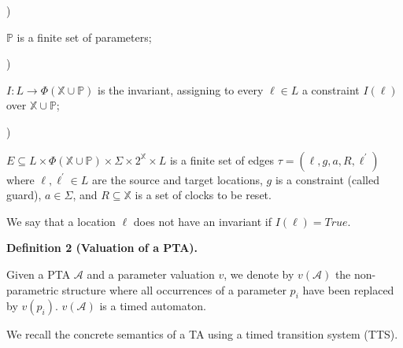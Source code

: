  
 
\par{}) 
 
$\mathbb{P}$ is a finite set of parameters;\par
 
 
 
\par{}) 
 
$I:L\to\Phi(\mathbb{X}\cup\mathbb{P})$ is the invariant, assigning to every $\mathrm{\ell}\in L$ a constraint $I(\mathrm{\ell})$ over $\mathbb{X}\cup\mathbb{P}$;\par
 
 
 
\par{}) 
 
$E\subseteq L\times\Phi(\mathbb{X}\cup\mathbb{P})\times\Sigma\times 2^{\mathbb{X}}\times L$ is a finite set of edges $\tau=(\mathrm{\ell},g,a,R,\mathrm{\ell}^{\prime})$ where $\mathrm{\ell},\mathrm{\ell}^{\prime}\in L$ are the source and target locations, $g$ is a constraint (called guard), $a\in\Sigma$, and $R\subseteq\mathbb{X}$ is a set of clocks to be reset.\par
 
 
  
We say that a location $\mathrm{\ell}$ does not have an invariant if $I(\mathrm{\ell})=\mathit{True}$.\par
 
 
 
 
\par\medskip\noindent\textbf{Definition 2 (Valuation of a PTA).}\par
 
 
Given a PTA $\mathcal{A}$ and a parameter valuation $v$, we denote by $v(\mathcal{A})$ the non-parametric structure where all occurrences of a parameter $p_{i}$ have been replaced by $v(p_{i})$. $v(\mathcal{A})$ is a timed automaton.\par
 
 
 
 
We recall the concrete semantics of a TA using a timed transition system (TTS).\par
 
